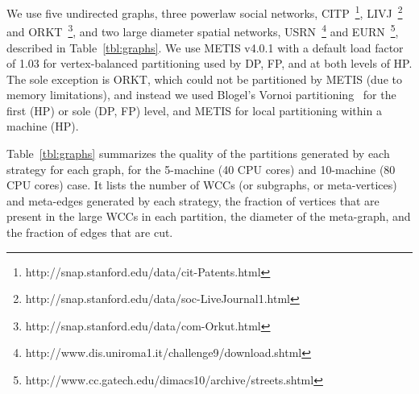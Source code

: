 \documentclass[10pt,conference, compsocconf]{IEEEtran}
\begin{document}
We use five undirected graphs, three powerlaw social networks, CITP~\footnote{http://snap.stanford.edu/data/cit-Patents.html}, LIVJ~\footnote{http://snap.stanford.edu/data/soc-LiveJournal1.html} and ORKT~\footnote{http://snap.stanford.edu/data/com-Orkut.html}, and two large diameter spatial networks, USRN~\footnote{http://www.dis.uniroma1.it/challenge9/download.shtml} and EURN~\footnote{http://www.cc.gatech.edu/dimacs10/archive/streets.shtml}, described in Table~\ref{tbl:graphs}. We use METIS v4.0.1 with a default load factor of 1.03 for vertex-balanced partitioning used by DP, FP, and at both levels of HP. The sole exception is ORKT, which could not be partitioned by METIS (due to memory limitations), and instead we used Blogel's Vornoi partitioning~\cite{blogel} for the first (HP) or sole (DP, FP) level, and METIS for local partitioning within a machine (HP).

Table~\ref{tbl:graphs} summarizes the quality of the partitions generated by each strategy for each graph, for the 5-machine (40 CPU cores) and 10-machine (80 CPU cores) case. It lists the number of WCCs (or subgraphs, or meta-vertices) and meta-edges generated by each strategy, the fraction of vertices that are present in the large WCCs in each partition, the diameter of the meta-graph, and the fraction of edges that are cut.
\end{document}
